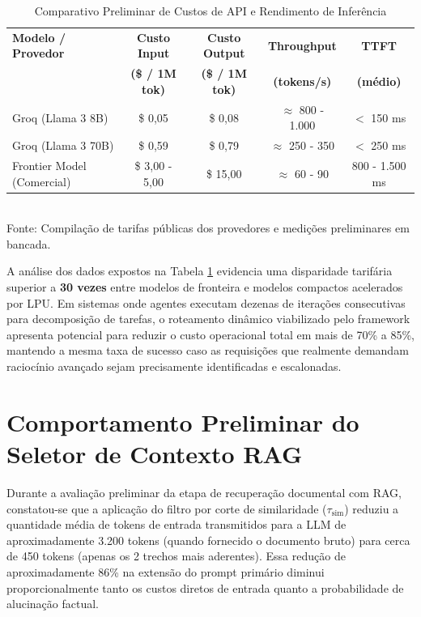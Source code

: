 \begin{table}[!htb]
\centering
\caption{Comparativo Preliminar de Custos de API e Rendimento de Inferência}
\label{tab:custos_modelos}
\begin{tabular}{|l|c|c|c|c|}
\hline
\textbf{Modelo / Provedor} & \textbf{Custo Input} & \textbf{Custo Output} & \textbf{Throughput} & \textbf{TTFT} \\
 & \textbf{(\$ / 1M tok)} & \textbf{(\$ / 1M tok)} & \textbf{(tokens/s)} & \textbf{(médio)} \\ \hline
Groq (Llama 3 8B) & \$ 0,05 & \$ 0,08 & $\approx$ 800 - 1.000 & $<$ 150 ms \\ \hline
Groq (Llama 3 70B) & \$ 0,59 & \$ 0,79 & $\approx$ 250 - 350 & $<$ 250 ms \\ \hline
Frontier Model (Comercial) & \$ 3,00 - 5,00 & \$ 15,00 & $\approx$ 60 - 90 & 800 - 1.500 ms \\ \hline
\end{tabular}
\\
\small{Fonte: Compilação de tarifas públicas dos provedores e medições preliminares em bancada.}
\end{table}

A análise dos dados expostos na Tabela \ref{tab:custos_modelos} evidencia uma disparidade tarifária superior a \textbf{30 vezes} entre modelos de fronteira e modelos compactos acelerados por LPU. Em sistemas onde agentes executam dezenas de iterações consecutivas para decomposição de tarefas, o roteamento dinâmico viabilizado pelo framework apresenta potencial para reduzir o custo operacional total em mais de 70\% a 85\%, mantendo a mesma taxa de sucesso caso as requisições que realmente demandam raciocínio avançado sejam precisamente identificadas e escalonadas.

\section{Comportamento Preliminar do Seletor de Contexto RAG}

Durante a avaliação preliminar da etapa de recuperação documental com RAG, constatou-se que a aplicação do filtro por corte de similaridade ($\tau_{\text{sim}}$) reduziu a quantidade média de tokens de entrada transmitidos para a LLM de aproximadamente 3.200 tokens (quando fornecido o documento bruto) para cerca de 450 tokens (apenas os 2 trechos mais aderentes). Essa redução de aproximadamente 86\% na extensão do prompt primário diminui proporcionalmente tanto os custos diretos de entrada quanto a probabilidade de alucinação factual.

